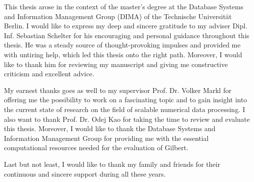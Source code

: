 \clearemptydoublepage
{}
{}	



\vspace*{2cm}

\begin{center}
\end{center}

\vspace{1cm}

This thesis arose in the context of the master’s degree at the Database Systems and Information Management Group (DIMA) of the Technische Universität Berlin. 
I would like to express my deep and sincere gratitude to my adviser Dipl. Inf. Sebastian Schelter for his encouraging and personal guidance throughout this thesis. 
He was a steady source of thought-provoking impulses and provided me with untiring help, which led this thesis onto the right path. 
Moreover, I would like to thank him for reviewing my manuscript and giving me constructive criticism and excellent advice.

My earnest thanks goes as well to my supervisor Prof. Dr. Volker Markl for offering me the possibility to work on a fascinating topic and to gain insight into the current state of research on the field of scalable numerical data processing.
I also want to thank Prof. Dr. Odej Kao for taking the time to review and evaluate this thesis.
Moreover, I would like to thank the Database Systems and Information Management Group for providing me with the essential computational resources needed for the evaluation of Gilbert.

Last but not least, I would like to thank my family and friends for their continuous and sincere support during all these years.